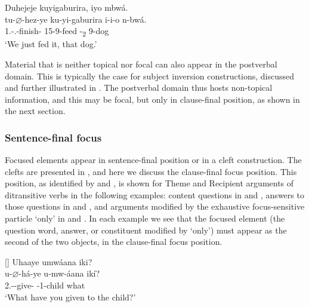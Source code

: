 \documentclass[output=paper]{langscibook}
\begin{document}
\ea
\label{bkm:Ref73818128}
Duhejeje kuyigaburira, iyo mbwá.\\
\gll
tu-$\varnothing$-hez-ye  ku-yi-gaburira  i-i-o  n-bwá.\\
1\PL.\SM-\PRS.\CJ-{}finish-\PFV{}  15-9\OM{}-feed  -\DEM{}\textsubscript{2}  9-dog\\
\glt
‘We just fed it, that dog.’\\

\z

Material that is neither topical nor focal can also appear in the postverbal domain. This is typically the case for subject inversion constructions, discussed and further illustrated in . The postverbal domain thus hosts non-topical information, and this may be focal, but only in clause-final position, as shown in the next section.

\subsubsection{Sentence-final focus}
\label{bkm:Ref81485890}
Focused elements appear in sentence-final position or in a cleft construction. The clefts are presented in , and here we discuss the clause-final focus position. This position, as identified by \citet{Sabimana1986} and \citet{Ndayiragije1999}, is shown for Theme and Recipient arguments of ditransitive verbs in the following examples: content questions in  and , answers to those questions in  and , and arguments modified by the exhaustive focus-sensitive particle ‘only’ in  and . In each example we see that the focused element (the question word, answer, or constituent modified by ‘only’) must appear as the second of the two objects, in the clause-final focus position.

\ea
\ea
\begin{xlist}
\exi{\CJ}
[]{
\label{bkm:Ref72332331}
Uhaaye umwáana iki?\\
\gll
u-$\varnothing$-há-ye  u-mw-áana  ikí?\\
2\SG.\SM-\PRS{}-give-\PFV{}  \AUG{}-1-child  what\\
\glt
‘What have you given to the child?’\\
}
\end{xlist}
\end{document}
